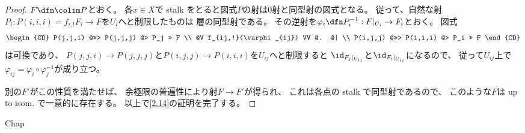 \documentclass[uplatex,dvipdfmx]{jsarticle}
\begin{document}
\begin{proof}
  \(F\dfn \colim P\)とおく。
  各\(x\in X\)で stalk をとると図式\(P\)の射は\(0\)射と同型射の図式となる。
  従って、自然な射\(P_i:P(i,i,i)=f_{i,!}F_i\to F\)を\(U_i\)へと制限したものは
  層の同型射である。
  その逆射を\(\varphi_i\dfn P_i^{-1}:F|_{U_i}\to F_i\)とおく。
  図式
  \[
  \begin{CD}
    P(j,j,i) @>>> P(j,j,j) @> P_j >> F \\
    @V f_{ij,!}(\varphi_{ij}) VV @. @| \\
    P(i,j,j) @>>> P(i,i,i) @> P_i >> F
  \end{CD}
  \]
  は可換であり、
  \(P(j,j,i)\to P(j,j,j)\)と\(P(i,j,j)\to P(i,i,i)\)を\(U_{ij}\)へと制限すると
  \(\id_{F_j|_{U_{ij}}}\)と\(\id_{F_i|_{U_{ij}}}\)になるので、
  従って\(U_{ij}\)上で
  \(\varphi_{ij} = \varphi_i\circ \varphi_j^{-1}\)が成り立つ。

  別の\(F'\)がこの性質を満たせば、
  余極限の普遍性により射\(F\to F'\)が得られ、
  これは各点の stalk で同型射であるので、
  このような\(F\)は up to isom. で一意的に存在する。
  以上で\autoref{2.14}の証明を完了する。
\end{proof}






\ifcsname Chap\endcsname\else
\printbibliography
\end{document}
